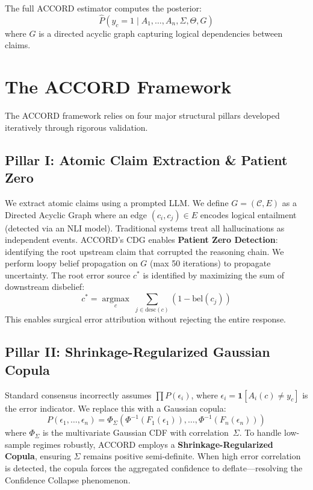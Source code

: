 \documentclass[conference]{IEEEtran}
\begin{document}
The full ACCORD estimator computes the posterior:
\begin{equation}
  \hat{P}(y_c = 1 \mid A_1,\ldots,A_n,\Sigma,\Theta,G)
\end{equation}
where $G$ is a directed acyclic graph capturing logical dependencies between claims. 

\section{The ACCORD Framework}
\label{sec:framework}

The ACCORD framework relies on four major structural pillars developed iteratively through rigorous validation.

\subsection{Pillar I: Atomic Claim Extraction \& Patient Zero}
We extract atomic claims using a prompted LLM. We define $G = (\mathcal{C}, E)$ as a Directed Acyclic Graph where an edge $(c_i, c_j) \in E$ encodes logical entailment (detected via an NLI model). Traditional systems treat all hallucinations as independent events. ACCORD's CDG enables \textbf{Patient Zero Detection}: identifying the root upstream claim that corrupted the reasoning chain. We perform loopy belief propagation on $G$ (max 50 iterations) to propagate uncertainty. The root error source $c^*$ is identified by maximizing the sum of downstream disbelief:
\begin{equation}
  c^* = \operatorname*{argmax}_{c}\; \sum_{j \in \mathrm{desc}(c)} (1 - \mathrm{bel}(c_j))
\end{equation}
This enables surgical error attribution without rejecting the entire response.

\subsection{Pillar II: Shrinkage-Regularized Gaussian Copula}
Standard consensus incorrectly assumes $\prod P(\epsilon_i)$, where $\epsilon_i = \mathbf{1}[A_i(c) \neq y_c]$ is the error indicator. We replace this with a Gaussian copula:
\begin{equation}
  P(\epsilon_1,\ldots,\epsilon_n)
  = \Phi_\Sigma\!\left( \Phi^{-1}(F_1(\epsilon_1)),\ldots, \Phi^{-1}(F_n(\epsilon_n)) \right)
\label{eq:copula}
\end{equation}
where $\Phi_\Sigma$ is the multivariate Gaussian CDF with correlation~$\Sigma$. To handle low-sample regimes robustly, ACCORD employs a \textbf{Shrinkage-Regularized Copula}, ensuring $\Sigma$ remains positive semi-definite. When high error correlation is detected, the copula forces the aggregated confidence to deflate—resolving the Confidence Collapse phenomenon.
\end{document}
